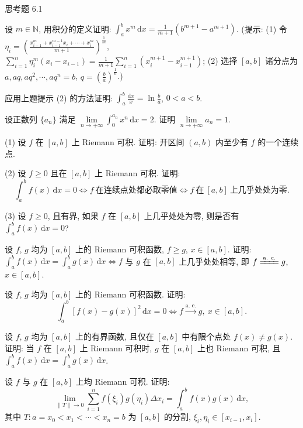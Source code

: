\begin{exblock}{思考题 6.1}
  \item 设 $m\in\mathbb{N}$, 用积分的定义证明: $\int_{a}^{b}x^{m}\,\mathrm{d}x=\frac{1}{m+1}(b^{m+1}-a^{m+1})$. (提示: (1) 令 $\eta_{i}=\left(\frac{x_{i-1}^{m}+x_{i-1}^{m-1}x_{i}+\cdots+x_{i}^{m}}{m+1}\right)^{\frac{1}{m}}$, $\sum\limits_{i=1}^{n}\eta_{i}^{m}(x_{i}-x_{i-1})=\frac{1}{m+1}\sum\limits_{i=1}^{n}(x_{i}^{m+1}-x_{i-1}^{m+1})$; (2) 选择 $[a,b]$ 诸分点为 $a,aq,aq^{2},\cdots,aq^{n}=b$, $q=\left(\frac{b}{a}\right)^{\frac{1}{n}}$.)

  \item 应用上题提示 (2) 的方法证明: $\int_{a}^{b}\frac{\mathrm{d}x}{x}=\ln\frac{b}{a}$, $0<a<b$.

  \item 设正数列 $\{a_{n}\}$ 满足 $\lim\limits_{n\to+\infty}\int_{0}^{a_{n}}x^{n}\,\mathrm{d}x=2$. 证明 $\lim\limits_{n\to+\infty}a_{n}=1$.

  \item (1) 设 $f$ 在 $[a,b]$ 上 Riemann 可积. 证明: 开区间 $(a,b)$ 内至少有 $f$ 的一个连续点.

  (2) 设 $f\geqslant 0$ 且在 $[a,b]$ 上 Riemann 可积. 证明:
  \[
  \int_{a}^{b}f(x)\,\mathrm{d}x=0\Longleftrightarrow f\ \text{在连续点处都必取零值}\Longleftrightarrow f\ \text{在}\ [a,b]\ \text{上几乎处处为零}.
\]

  (3) 设 $f\geqslant 0$, 且有界, 如果 $f$ 在 $[a,b]$ 上几乎处处为零, 则是否有 $\int_{a}^{b}f(x)\,\mathrm{d}x=0$?

  \item 设 $f$, $g$ 均为 $[a,b]$ 上的 Riemann 可积函数, $f\geqslant g$, $x\in[a,b]$. 证明: $\int_{a}^{b}f(x)\,\mathrm{d}x=\int_{a}^{b}g(x)\,\mathrm{d}x\Longleftrightarrow f$ 与 $g$ 在 $[a,b]$ 上几乎处处相等, 即 $f\xlongequal{\text{a. e.}}g$, $x\in[a,b]$.

  \item 设 $f$, $g$ 均为 $[a,b]$ 上的 Riemann 可积函数. 证明:
  \[
  \int_{a}^{b}[f(x)-g(x)]^{2}\,\mathrm{d}x=0\Longleftrightarrow f\xrightarrow{\text{a. e.}}g,\ x\in[a,b].
\]

  \item 设 $f$, $g$ 均为 $[a,b]$ 上的有界函数, 且仅在 $[a,b]$ 中有限个点处 $f(x)\neq g(x)$. 证明: 当 $f$ 在 $[a,b]$ 上 Riemann 可积时, $g$ 在 $[a,b]$ 上也 Riemann 可积, 且 $\int_{a}^{b}f(x)\,\mathrm{d}x=\int_{a}^{b}g(x)\,\mathrm{d}x$.

  \item 设 $f$ 与 $g$ 在 $[a,b]$ 上均 Riemann 可积. 证明:
  \[
  \lim_{\|T\|\to 0}\sum_{i=1}^{n}f(\xi_{i})g(\eta_{i})\Delta x_{i}=\int_{a}^{b}f(x)g(x)\,\mathrm{d}x,
\]
  其中 $T:a=x_{0}<x_{1}<\cdots<x_{n}=b$ 为 $[a,b]$ 的分割, $\xi_{i},\eta_{i}\in[x_{i-1},x_{i}]$.


\end{exblock}
